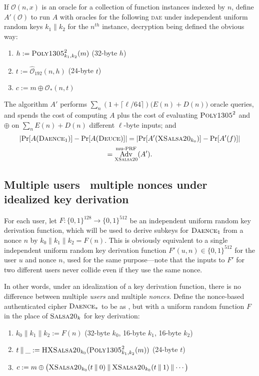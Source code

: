 \documentclass{article}
\newcommand{\term}[1]{\textbf{#1}}
\def\operatorsc#1{{%
  \ifmmode\let\next=\operatorname\else\let\next=\relax\fi\next{\textsc{#1}}}}
\def\Salsa#1/{\operatorsc{Salsa#1}}
\def\XSalsa#1/{\operatorsc{XSalsa#1}}
\def\HXSalsa#1/{\operatorsc{HXSalsa#1}}
\def\Poly#1/{\operatorsc{Poly#1}}
\def\DAENCE/{\operatorsc{Daence}}
\def\DEUCE/{\operatorsc{Deuce}}
\def\muPRF{%
  \ifmmode\def\next{\operatorname{mu-PRF}}%
    \else\def\next/{mu-\textsc{prf}}%
  \fi\next}
\def\DAE{%
  \ifmmode\def\next{\operatorname{DAE}}%
    \else\def\next/{\textsc{dae}}%
  \fi\next}
\DeclareMathOperator{\Adv}{Adv}
\newcommand{\concat}{\mathbin\|}
\begin{document}
If $\mathcal O(n,x)$ is an oracle for a collection of function
 instances indexed by $n$, define $A'(\mathcal O)$ to run $A$ with
 oracles for the following \DAE/ under independent uniform random keys
 $k_1 \concat k_2$ for the $n^{\mathit{th}}$ instance, decryption
 being defined the obvious way:
%
\begin{enumerate}
  \item $h := \Poly1305/^2_{k_1,k_2}(m)$
    \hfill (32-byte $h$)
  \item $t := \hat{\mathcal O}_{192}(n, h)$
    \hfill (24-byte $t$)
  \item $c := m \oplus \mathcal O_*(n, t)$
\end{enumerate}
%
The algorithm $A'$ performs
 $\sum_n (1 + \lceil\ell/64\rceil) \bigl(E(n) + D(n)\bigr)$ oracle
 queries, and spends the cost of computing $A$ plus the cost of
 evaluating $\Poly1305/^2$ and $\oplus$ on $\sum_n E(n) + D(n)$
 different $\ell$-byte inputs; and
%
\begin{multline*}
  \lvert\Pr[A(\DAENCE/_1)] - \Pr[A(\DEUCE/)]\rvert
   = \lvert\Pr[A'(\XSalsa20/_{k_0})] - \Pr[A'(f)]\rvert \\
   = \Adv^{\muPRF}_{\XSalsa20/}(A').
\end{multline*}

\subsection{Multiple users \vs\ multiple nonces under idealized key derivation}

For each user, let $F\colon \{0,1\}^{128} \to \{0,1\}^{512}$ be an
 independent uniform random key derivation function, which will be
 used to derive subkeys for $\DAENCE/_1$ from a nonce $n$ by
 $k_0 \concat k_1 \concat k_2 = F(n)$.
This is obviously equivalent to a single independent uniform random
 key derivation function $F'(u,n) \in \{0,1\}^{512}$ for the user $u$
 and nonce $n$, used for the same purpose---note that the inputs to
 $F'$ for two different users never collide even if they use the same
 nonce.

In other words, under an idealization of a key derivation function,
 there is no difference between multiple \emph{users} and multiple
 \emph{nonces}.
Define the nonce-based authenticated cipher \term{$\DAENCE/_*$} to be
 as \DAENCE/, but with a uniform random function $F$ in the place of
 $\Salsa20/_k$ for key derivation:
%
\begin{enumerate}
  \item $k_0 \concat k_1 \concat k_2 := F(n)$
    \hfill (32-byte $k_0$, 16-byte $k_1$, 16-byte $k_2$)
  \item $t \concat \_ := \HXSalsa20/_{k_0}(\Poly1305/^2_{k_1,k_2}(m))$
    \hfill (24-byte $t$)
  \item $c := m \oplus \bigl(\XSalsa20/_{k_0}(t \mathbin\| 0) \concat
      \XSalsa20/_{k_0}(t \mathbin\| 1) \concat \dotsb\bigr)$
\end{enumerate}
\end{document}
